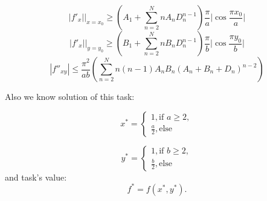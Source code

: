 \documentclass[12pt]{article}
\begin{document}
$$|f'_x|\Big|_{x = x_0} \geq \left(A_1 + \sum\limits_{n=2}^N n A_n D_n^{n-1}\right)\frac{\pi}{a}\Big|\cos \frac{\pi x_0}{a}\Big|$$
$$|f'_x|\Big|_{y = y_0} \geq \left(B_1 + \sum\limits_{n=2}^N n B_n D_n^{n-1}\right)\frac{\pi}{b}\Big|\cos \frac{\pi y_0}{b}\Big|$$
$$|f''_{xy}| \leq \frac{\pi^2}{ab}\left(\sum\limits_{n=2}^Nn(n-1)A_nB_n\left(A_n + B_n + D_n\right)^{n-2}\right)$$

Also we know solution of this task:

\begin{equation}
x^* = \begin{cases}
1, \text{if $a \geq 2$},\\
\frac{a}{2}, \text{else}
\end{cases}
\end{equation}

\begin{equation}
y^* = \begin{cases}
1, \text{if $b \geq 2$},\\
\frac{b}{2}, \text{else}
\end{cases}
\end{equation}
and task's value:
$$f^* = f(x^*, y^*).$$
\end{document}
